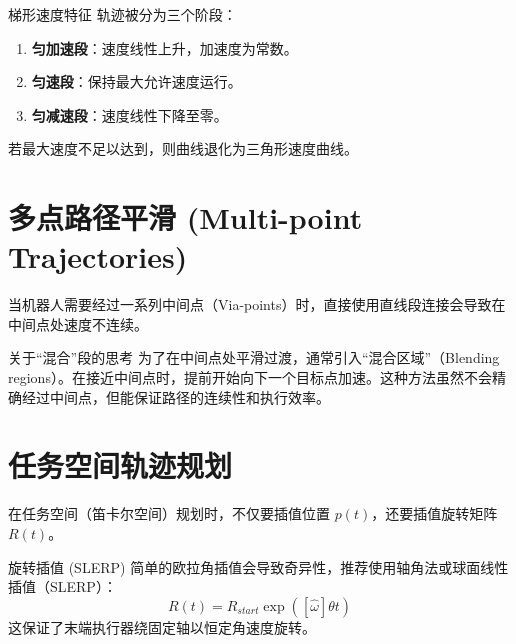 \begin{defbox}{梯形速度特征}
轨迹被分为三个阶段：
\begin{enumerate}
    \item \textbf{匀加速段}：速度线性上升，加速度为常数。
    \item \textbf{匀速段}：保持最大允许速度运行。
    \item \textbf{匀减速段}：速度线性下降至零。
\end{enumerate}
若最大速度不足以达到，则曲线退化为三角形速度曲线。
\end{defbox}

\section{多点路径平滑 (Multi-point Trajectories)}
当机器人需要经过一系列中间点（Via-points）时，直接使用直线段连接会导致在中间点处速度不连续。

\begin{thoughtbox}{关于“混合”段的思考}
为了在中间点处平滑过渡，通常引入“混合区域”（Blending regions）。在接近中间点时，提前开始向下一个目标点加速。这种方法虽然不会精确经过中间点，但能保证路径的连续性和执行效率。
\end{thoughtbox}



\section{任务空间轨迹规划}
在任务空间（笛卡尔空间）规划时，不仅要插值位置 $p(t)$，还要插值旋转矩阵 $R(t)$。

\begin{formulabox}{旋转插值 (SLERP)}
简单的欧拉角插值会导致奇异性，推荐使用轴角法或球面线性插值（SLERP）：
\begin{equation}
    R(t) = R_{start} \exp([\hat{\omega}]\theta t)
\end{equation}
这保证了末端执行器绕固定轴以恒定角速度旋转。
\end{formulabox}

\clearpage